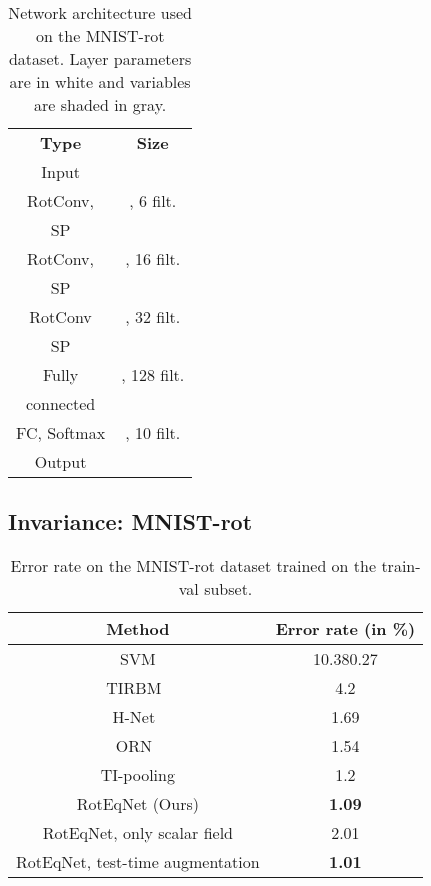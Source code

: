 \documentclass[10pt,twocolumn,letterpaper,table]{article}
\begin{document}
\begin{table}[!t]
  \centering
{\footnotesize 
\begin{tabular}{|c|c|}
\hline \textbf{Type} & \textbf{Size}\\ 
\rowcolor{lightgray}
\hline Input & \\
\hline RotConv, & , 6 filt.\\ \cline{2-2}
 SP &   \cellcolor{lightgray} \\ 
\hline RotConv,  & , 16 filt. \\  \cline{2-2}
 SP & \cellcolor{lightgray} \\
\hline RotConv & , 32 filt.\\ \cline{2-2}
 SP  &  \cellcolor{lightgray} \\ 
\hline Fully & , 128 filt.\\
connected &  \cellcolor{lightgray}\\
\hline FC, Softmax & , 10 filt.\\
\rowcolor{lightgray}
\hline Output &  \\ \hline 
\end{tabular} 
}
\vspace*{1mm}
\caption{Network architecture used on the MNIST-rot dataset. Layer parameters are in white and variables are shaded in gray.} \label{tab:mnist_arch}
\vspace*{-5mm}
\end{table}
   
\subsection{Invariance: MNIST-rot}

\begin{table}[!b]
  \vspace*{-3mm}
	\centering
	{\footnotesize
		\begin{tabular}{|c|c|}
			\hline \textbf{Method} & \textbf{Error rate (in \%)}\\ 
			\hline 
			SVM \cite{larochelle2007empirical} & 10.380.27\\
TIRBM~\cite{sohn2012learning} & 4.2\\
H-Net~\cite{worrall2016harmonic} & 1.69\\
ORN~\cite{zhou2017oriented} & 1.54\\
TI-pooling \cite{laptev2016ti} & 1.2\\ 
RotEqNet (Ours) & \textbf{1.09}\\ 
			\hline 
			RotEqNet, only scalar field & 2.01\\ 
RotEqNet, test-time augmentation & \textbf{1.01}\\ 
			\hline 
		\end{tabular} 
	}
	\vspace{0.1cm}
	\caption{Error rate on the MNIST-rot dataset trained on the train-val subset. }
\label{tab:mnist}
\end{table}
\end{document}
